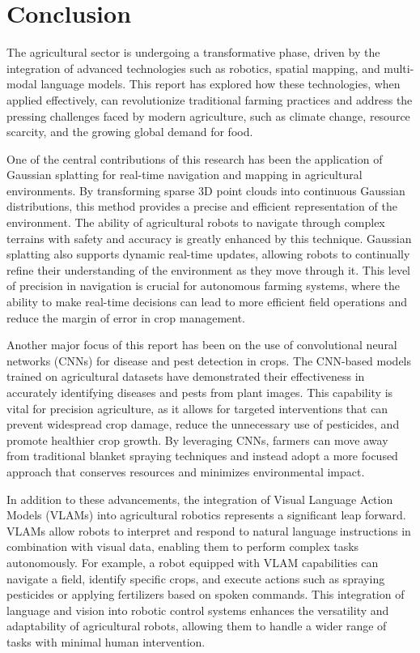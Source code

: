 \chapter{Conclusion}

The agricultural sector is undergoing a transformative phase, driven by the integration of advanced technologies such as robotics, spatial mapping, and multi-modal language models. This report has explored how these technologies, when applied effectively, can revolutionize traditional farming practices and address the pressing challenges faced by modern agriculture, such as climate change, resource scarcity, and the growing global demand for food.

One of the central contributions of this research has been the application of Gaussian splatting for real-time navigation and mapping in agricultural environments. By transforming sparse 3D point clouds into continuous Gaussian distributions, this method provides a precise and efficient representation of the environment. The ability of agricultural robots to navigate through complex terrains with safety and accuracy is greatly enhanced by this technique. Gaussian splatting also supports dynamic real-time updates, allowing robots to continually refine their understanding of the environment as they move through it. This level of precision in navigation is crucial for autonomous farming systems, where the ability to make real-time decisions can lead to more efficient field operations and reduce the margin of error in crop management.

Another major focus of this report has been on the use of convolutional neural networks (CNNs) for disease and pest detection in crops. The CNN-based models trained on agricultural datasets have demonstrated their effectiveness in accurately identifying diseases and pests from plant images. This capability is vital for precision agriculture, as it allows for targeted interventions that can prevent widespread crop damage, reduce the unnecessary use of pesticides, and promote healthier crop growth. By leveraging CNNs, farmers can move away from traditional blanket spraying techniques and instead adopt a more focused approach that conserves resources and minimizes environmental impact.

In addition to these advancements, the integration of Visual Language Action Models (VLAMs) into agricultural robotics represents a significant leap forward. VLAMs allow robots to interpret and respond to natural language instructions in combination with visual data, enabling them to perform complex tasks autonomously. For example, a robot equipped with VLAM capabilities can navigate a field, identify specific crops, and execute actions such as spraying pesticides or applying fertilizers based on spoken commands. This integration of language and vision into robotic control systems enhances the versatility and adaptability of agricultural robots, allowing them to handle a wider range of tasks with minimal human intervention.

